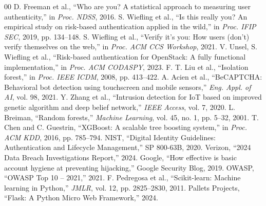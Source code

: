 \documentclass[conference]{IEEEtran}
\begin{document}
\begin{thebibliography}{00}
 D. Freeman et al., ``Who are you? A statistical approach to measuring user authenticity,'' in \textit{Proc. NDSS}, 2016.
 S. Wiefling et al., ``Is this really you? An empirical study on risk-based authentication applied in the wild,'' in \textit{Proc. IFIP SEC}, 2019, pp. 134--148.
 S. Wiefling et al., ``Verify it's you: How users (don't) verify themselves on the web,'' in \textit{Proc. ACM CCS Workshop}, 2021.
 V. Unsel, S. Wiefling et al., ``Risk-based authentication for OpenStack: A fully functional implementation,'' in \textit{Proc. ACM CODASPY}, 2023.
 F. T. Liu et al., ``Isolation forest,'' in \textit{Proc. IEEE ICDM}, 2008, pp. 413--422.
 A. Acien et al., ``BeCAPTCHA: Behavioral bot detection using touchscreen and mobile sensors,'' \textit{Eng. Appl. of AI}, vol. 98, 2021.
 Y. Zhang et al., ``Intrusion detection for IoT based on improved genetic algorithm and deep belief network,'' \textit{IEEE Access}, vol. 7, 2020.
 L. Breiman, ``Random forests,'' \textit{Machine Learning}, vol. 45, no. 1, pp. 5--32, 2001.
 T. Chen and C. Guestrin, ``XGBoost: A scalable tree boosting system,'' in \textit{Proc. ACM KDD}, 2016, pp. 785--794.
 NIST, ``Digital Identity Guidelines: Authentication and Lifecycle Management,'' SP 800-63B, 2020.
 Verizon, ``2024 Data Breach Investigations Report,'' 2024.
 Google, ``How effective is basic account hygiene at preventing hijacking,'' Google Security Blog, 2019.
 OWASP, ``OWASP Top 10 -- 2021,'' 2021.
 F. Pedregosa et al., ``Scikit-learn: Machine learning in Python,'' \textit{JMLR}, vol. 12, pp. 2825--2830, 2011.
 Pallets Projects, ``Flask: A Python Micro Web Framework,'' 2024.
\end{thebibliography}
\end{document}

